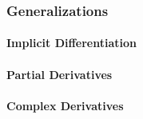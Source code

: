

\subsubsection{Generalizations}

\paragraph{Implicit Differentiation}

\paragraph{Partial Derivatives}

\paragraph{Complex Derivatives}

